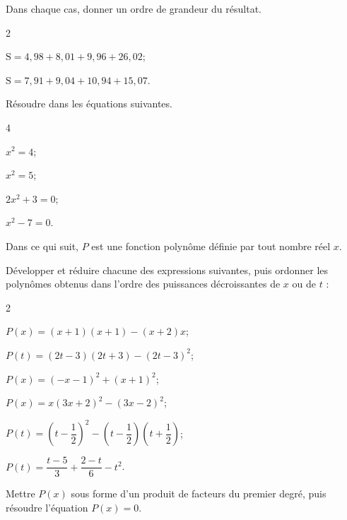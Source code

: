 \documentclass[a4paper,10pt]{book}        %
\begin{document}

Dans chaque cas, donner un ordre de grandeur du résultat.
\begin{multicols}{2}
	\begin{enumMet}
	\item $\mathrm{S}=4,98+8,01+9,96+26,02$;
	\item $\mathrm{S}=7,91+9,04+10,94+15,07$.
\end{enumMet}
\end{multicols}



Résoudre dans \R les équations suivantes.
\begin{multicols}{4}
	\begin{enumMet}
	\item $x^{2}=4$;
	\item $x^{2}=5$;
	\item $2 x^{2}+3=0$;
	\item $x^{2}-7=0$.
\end{enumMet}
\end{multicols}



Dans ce qui suit, $P$ est une fonction polynôme définie par tout nombre réel $x$.

Développer et réduire chacune des expressions suivantes, puis ordonner les polynômes obtenus dans l'ordre des puissances décroissantes de $x$ ou de $t$ :

\begin{multicols}{2}
	\begin{enumMet}
	\item $P(x)=(x+1)(x+1)-(x+2) x$;
	\item $P(t)=(2 t-3)(2 t+3)-(2 t-3)^{2}$;
	\item $P(x)=(-x-1)^{2}+(x+1)^{2}$;
	\item $P(x)=x(3 x+2)^{2}-(3 x-2)^{2}$;
	\item $P(t)=\left(t-\dfrac{1}{2}\right)^{2}-\left(t-\dfrac{1}{2}\right)\left(t+\dfrac{1}{2}\right)$;
	\item $P(t)=\dfrac{t-5}{3}+\dfrac{2-t}{6}-t^{2}$.
\end{enumMet}
\end{multicols}


Mettre $P(x)$ sous forme d'un produit de facteurs du premier degré, puis résoudre l'équation $P(x)=0$.
\end{document}
